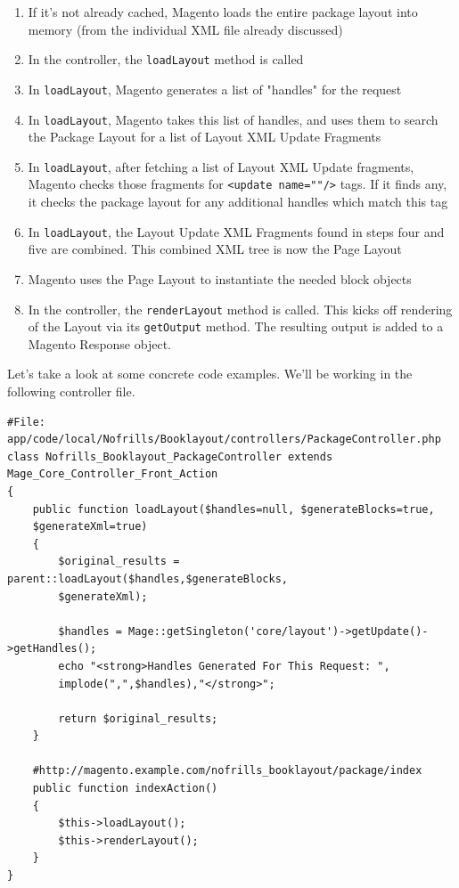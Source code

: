 \documentclass[oneside]{book}
\begin{document}
\begin{enumerate}
\item If it's not already cached, Magento loads the entire package layout into memory (from the individual XML file already discussed)     
\item In the controller, the \footnotesize\texttt{loadLayout} \normalsize  method is called
\item In \footnotesize\texttt{loadLayout}\normalsize, Magento generates a list of "handles" for the request
\item In \footnotesize\texttt{loadLayout}\normalsize, Magento takes this list of handles, and uses them to search the Package Layout for a list of Layout XML Update Fragments
\item In \footnotesize\texttt{loadLayout}\normalsize, after fetching a list of Layout XML Update fragments, Magento checks those fragments for \footnotesize\texttt{\textless update name=""/\textgreater } \normalsize  tags.  If it finds any, it checks the package layout for any additional handles which match this tag
\item In \footnotesize\texttt{loadLayout}\normalsize, the Layout Update XML Fragments found in steps four and five are combined.  This combined XML tree is now the Page Layout
\item Magento uses the Page Layout to instantiate the needed block objects
\item In the controller, the \footnotesize\texttt{renderLayout} \normalsize  method is called.  This kicks off rendering of the Layout via its \footnotesize\texttt{getOutput} \normalsize  method.  The resulting output is added to a Magento Response object.  
\end{enumerate}


Let's take a look at some concrete code examples. We'll be working in the following controller file.

\begin{lstlisting}
#File: app/code/local/Nofrills/Booklayout/controllers/PackageController.php
class Nofrills_Booklayout_PackageController extends
Mage_Core_Controller_Front_Action
{       
    public function loadLayout($handles=null, $generateBlocks=true,
    $generateXml=true)      
    {
        $original_results = parent::loadLayout($handles,$generateBlocks,
        $generateXml);

        $handles = Mage::getSingleton('core/layout')->getUpdate()->getHandles();
        echo "<strong>Handles Generated For This Request: ",
        implode(",",$handles),"</strong>";

        return $original_results;
    }

    #http://magento.example.com/nofrills_booklayout/package/index
    public function indexAction()
    {
        $this->loadLayout();
        $this->renderLayout();          
    }
}

\end{lstlisting}
\end{document}
